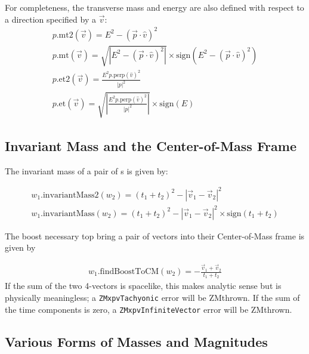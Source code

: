 \noindent
For completeness, the transverse mass and energy are also defined with respect 
to a direction specified by a \SV $\vec{v}$:
\begin{eqnarray}
  p\mbox{.mt2}(\vec{v}) = E^2 - ( \vec{p} \cdot \hat{v} )^2   \\
  p\mbox{.mt}(\vec{v}) = \sqrt {\left| E^2 - (\vec{p} \cdot \hat{v})^2\right|}
			\times \mbox{sign}(E^2 - ( \vec{p} \cdot \hat{v} )^2 )
			\\
  p\mbox{.et2}(\vec{v}) = \frac {E^2 p.\mbox{perp}(\hat{v})^2} {|p|^2} \\
  p\mbox{.et}(\vec{v}) = \sqrt { \left| \frac {E^2 p.\mbox{perp}(\hat{v})^2}
			{|p|^2} \right| } 
			\times \mbox{sign}(E)
\end{eqnarray}





\subsection{Invariant Mass and the Center-of-Mass Frame}

The invariant mass of a pair of \LV s is given by:

\begin{eqnarray}
\label{eq:winvMass2}
  w_1\mbox{.invariantMass2}(w_2) =
	\left(t_1+t_2\right)^2 - \left| \vec{v}_1 -  \vec{v}_2 \right| ^2 \\
\label{eq:winvMass}
  w_1\mbox{.invariantMass}(w_2) =
	\left(t_1+t_2\right)^2 - \left| \vec{v}_1 -  \vec{v}_2 \right| ^2
	\times \mbox{sign}(t_1 + t_2)
\end{eqnarray}

The boost necessary top bring a pair of vectors into their Center-of-Mass
frame is given by

\begin{eqnarray}
\label{eq:wfindBoost}
  w_1\mbox{.findBoostToCM}(w_2) = - \frac{\vec{v}_1 + \vec{v}_2}{t_1+t_2}
\end{eqnarray}
\noindent
If the sum of the two 4-vectors is spacelike, this makes analytic sense but
is physically meaningless; a {\tt ZMxpvTachyonic} error will be ZMthrown.
If the sum of the time components is zero, a
{\tt ZMxpvInfiniteVector} error will be ZMthrown.

\subsection{Various Forms of Masses and Magnitudes}

